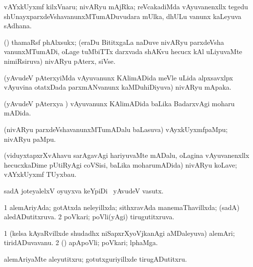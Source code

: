 \bentry
{} 
\gl{\nA}
\expl{}
\bmng
 vAYxkUyxmf kilxVnaru; nivARyu mAjRka; reVcakadiMda vAyuvanenxllx tegedu shUnayxparxdeVshavanunxMTumADuvudara mUlka, dhULu \mo vanunx kaLeyuva sAdhana. 
\emng
\eentry

\bentry
{}
\gl{\nA}
\expl{}
\bmng
 (\birx) thamaRsf phAlxsukx; (eraDu BititxgaLa naDuve nivARyu parxdeVsha vanunxMTumADi, oLage tuMbiTTx darxvada shAKvu hecucx kAl uLiyuvaMte nimiRsiruva) nivARyu pAterx, siVse. 
\emng
\eentry

\bentry
{} 
\gl{\nA}
\expl{}
\bmng
 (yAvudeV pAterxyiMda vAyuvanunx KAlimADida meVle uLida alpxsavxlpx vAyuvina otatxDada parxmANvanunx kaMDuhiDiyuva) nivARyu mApaka. 
\emng
\eentry

\bentry
{} 
\gl{\gu}
\expl{}
\bmng
 (yAvudeV pAterxya \vi) vAyuvanunx KAlimADida baLika BadarxvAgi moharu mADida. 
\emng
\eentry

\bentry
{}
\gl{\nA}
\expl{}
\bmng
 (nivARyu parxdeVshavanunxMTumADalu baLasuva) vAyxkUyxmfpaMpu; nivARyu paMpu. 
\emng
\eentry

\bentry
{}
\gl{\nA}
\expl{}
\bmng
 (viduyxtapxrXvAhavu sarAgavAgi hariyuvaMte mADalu, oLagina vAyuvanenxllx hecucxkaDime pUtiRyAgi coVSisi, baLika moharumADida) nivARyu koLave; vAYxkUyxmf TUyxbau. 
\emng
\eentry

\bentry
{}
\gl{\saMkiSx}
\expl{}
\bmng
\emng
\eentry

\bentry
{} 
\gl{\nA}
\expl{}
\bmng
sadA joteyalelxV oyuyxva keYpiDi \mo\ yAvudeV vasutx. 
\emng
\eentry

\bentry
{} 
\gl{\gu}
\expl{}
\bmng
\bnum
\num{1} alemAriyAda; gotAtxda neleyillxda; sithxravAda manemaThavillxda; (sadA) aledADutitxruva. 
\num{2} poVkari; poVli(yAgi) tirugutitxruva. 
\enum
\emng
\eentry

\bentry
{} 
\gl{\nA}
\expl{}
\bmng
\bnum
\num{1} (kelsa kAyaRvillxde shudadhx niSapxrXyoVjkanAgi aMDaleyuva) alemAri; tiridADuvavanu. 
\num{2} (\AmA) apApoVli; poVkari; lphaMga. 
\enum
\emng
\eentry

\bentry
{} 
\gl{\akirx}
\expl{}
\bmng
 alemAriyaMte aleyutitxru; gotutxguriyillxde tirugADutitxru. 
\emng
\eentry

